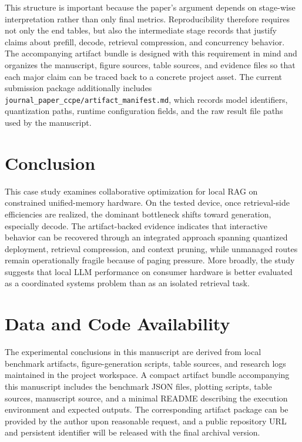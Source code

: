 \documentclass[10pt,twocolumn]{article}
\begin{document}
This structure is important because the paper's argument depends on stage-wise interpretation rather than only final metrics. Reproducibility therefore requires not only the end tables, but also the intermediate stage records that justify claims about prefill, decode, retrieval compression, and concurrency behavior. The accompanying artifact bundle is designed with this requirement in mind and organizes the manuscript, figure sources, table sources, and evidence files so that each major claim can be traced back to a concrete project asset. The current submission package additionally includes \texttt{journal\_paper\_ccpe/artifact\_manifest.md}, which records model identifiers, quantization paths, runtime configuration fields, and the raw result file paths used by the manuscript.

\section{Conclusion}

This case study examines collaborative optimization for local RAG on constrained unified-memory hardware. On the tested device, once retrieval-side efficiencies are realized, the dominant bottleneck shifts toward generation, especially decode. The artifact-backed evidence indicates that interactive behavior can be recovered through an integrated approach spanning quantized deployment, retrieval compression, and context pruning, while unmanaged routes remain operationally fragile because of paging pressure. More broadly, the study suggests that local LLM performance on consumer hardware is better evaluated as a coordinated systems problem than as an isolated retrieval task.

\section*{Data and Code Availability}

The experimental conclusions in this manuscript are derived from local benchmark artifacts, figure-generation scripts, table sources, and research logs maintained in the project workspace. A compact artifact bundle accompanying this manuscript includes the benchmark JSON files, plotting scripts, table sources, manuscript source, and a minimal README describing the execution environment and expected outputs. The corresponding artifact package can be provided by the author upon reasonable request, and a public repository URL and persistent identifier will be released with the final archival version.
\end{document}
